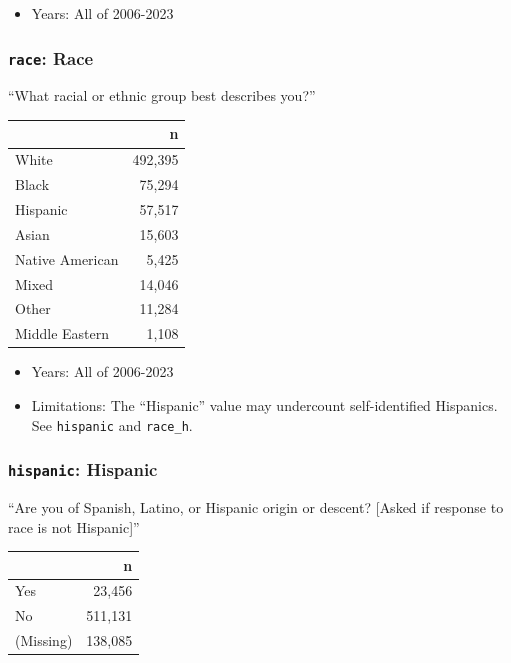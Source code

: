 \documentclass[10pt,article,oneside]{memoir}
\theoremstyle{definition}
\begin{document}
\begin{itemize}
\tightlist
\item
  Years: All of 2006-2023
\end{itemize}

\subsubsection{\texorpdfstring{\texttt{race}:
Race}{race: Race}}\label{race-race}

``What racial or ethnic group best describes you?''

\begin{table}[H]
\centering
\begin{tabular}[t]{lr}
\toprule
 & n\\
\midrule
White & 492,395\\
Black & 75,294\\
Hispanic & 57,517\\
Asian & 15,603\\
Native American & 5,425\\
Mixed & 14,046\\
Other & 11,284\\
Middle Eastern & 1,108\\
\bottomrule
\end{tabular}
\end{table}

\begin{itemize}
\tightlist
\item
  Years: All of 2006-2023
\item
  Limitations: The ``Hispanic'' value may undercount self-identified
  Hispanics. See \texttt{hispanic} and \texttt{race\_h}.
\end{itemize}

\subsubsection{\texorpdfstring{\texttt{hispanic}:
Hispanic}{hispanic: Hispanic}}\label{hispanic-hispanic}

``Are you of Spanish, Latino, or Hispanic origin or descent? {[}Asked if
response to race is not Hispanic{]}''

\begin{table}[H]
\centering
\begin{tabular}[t]{lr}
\toprule
 & n\\
\midrule
Yes & 23,456\\
No & 511,131\\
(Missing) & 138,085\\
\bottomrule
\end{tabular}
\end{table}
\end{document}
